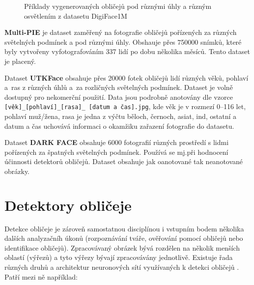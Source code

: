 \begin{figure}[H]
  \begin{center}
  \label{obrazek:digiface}
  \caption{Příklady vygenerovaných obličejů pod různými úhly a různým osvětlením z datasetu DigiFace1M \cite{digiface1m}}
  \end{center}
\end{figure}

\textbf{Multi-PIE} \cite{multipie} je dataset zaměřený na fotografie obličejů pořízených za různých světelných podmínek a pod různými úhly. Obshauje přes 750000 snímků, které byly vytvořeny vyfotografováním 337 lidí po dobu několika měsíců. Tento dataset je placený.

Dataset \textbf{UTKFace} \cite{utkface} obsahuje přes 20000 fotek obličejů lidí různých věků, pohlaví a~ras z různých úhlů a~za rozličných světelných podmínek. Dataset je volně dostupný pro nekomerční použití. Data jsou podrobně anotovány dle vzorce \texttt{[věk]\_[pohlaví]\_[rasa]\_
[datum a čas].jpg}, kde věk je v rozmezí 0--116 let, pohlaví muž/žena, rasa je jedna z výčtu běloch, černoch, asiat, ind, ostatní a datum a čas uchovává informaci o okamžiku zařazení fotografie do datasetu.

Dataset \textbf{DARK FACE} \cite{darkFace} obsahuje 6000 fotografií různých prostředí s lidmi pořízených za špatných světelných podmínek. Používá se mj.při hodnocení účinnosti detektorů obličejů. Dataset obsahuje jak oanotované tak neanotované obrázky.

\section{Detektory obličeje}
\label{sekce:NSdetektory}

Detekce obličeje je zároveň samostatnou disciplínou i vstupním bodem několika dalších analyzačníh úkonů (rozpoznávání tváře, ověřování pomocí obličejů nebo identifikace obličejů). Zpracovávaný obrázek bývá rozdělen na několik menších oblastí (výřezů) a tyto výřezy bývají zpracovávány jednotlivě. 
Existuje řada různých druhů a architektur neuronových sítí využívaných k detekci obličejů \cite{fdReviewNS}. Patří mezi ně například:

